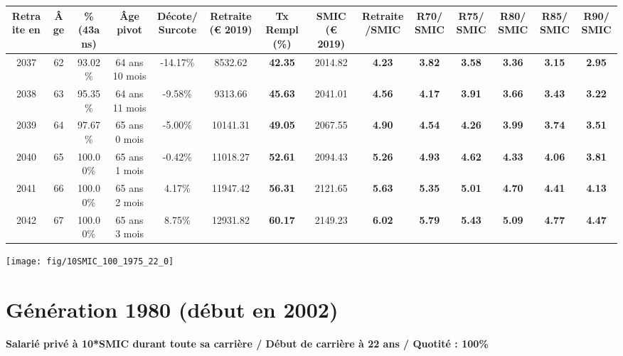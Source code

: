 \begin{adjustbox}{max width=\textwidth} 
\begin{tabular}[htb]{|c|c||c|c|c||c|c||c|c||c|c|c|c|c|} 
\hline 
 Retraite en &  Âge &  \%(43ans) &  Âge pivot &  Décote/Surcote &  Retraite (\euro{} 2019) &  Tx Rempl(\%) &  SMIC (\euro{} 2019) &  Retraite/SMIC &  R70/SMIC &  R75/SMIC &  R80/SMIC &  R85/SMIC &  R90/SMIC \\ 
\hline \hline 
 2037 &  62 &  93.02\% &  64 ans 10 mois &  -14.17\% &  8532.62 &  {\bf 42.35} &  2014.82 &  {\bf 4.23} &  {\bf 3.82} &  {\bf 3.58} &  {\bf 3.36} &  {\bf 3.15} &  {\bf 2.95} \\ 
\hline 
 2038 &  63 &  95.35\% &  64 ans 11 mois &  -9.58\% &  9313.66 &  {\bf 45.63} &  2041.01 &  {\bf 4.56} &  {\bf 4.17} &  {\bf 3.91} &  {\bf 3.66} &  {\bf 3.43} &  {\bf 3.22} \\ 
\hline 
 2039 &  64 &  97.67\% &  65 ans 0 mois &  -5.00\% &  10141.31 &  {\bf 49.05} &  2067.55 &  {\bf 4.90} &  {\bf 4.54} &  {\bf 4.26} &  {\bf 3.99} &  {\bf 3.74} &  {\bf 3.51} \\ 
\hline 
 2040 &  65 &  100.00\% &  65 ans 1 mois &  -0.42\% &  11018.27 &  {\bf 52.61} &  2094.43 &  {\bf 5.26} &  {\bf 4.93} &  {\bf 4.62} &  {\bf 4.33} &  {\bf 4.06} &  {\bf 3.81} \\ 
\hline 
 2041 &  66 &  100.00\% &  65 ans 2 mois &  4.17\% &  11947.42 &  {\bf 56.31} &  2121.65 &  {\bf 5.63} &  {\bf 5.35} &  {\bf 5.01} &  {\bf 4.70} &  {\bf 4.41} &  {\bf 4.13} \\ 
\hline 
 2042 &  67 &  100.00\% &  65 ans 3 mois &  8.75\% &  12931.82 &  {\bf 60.17} &  2149.23 &  {\bf 6.02} &  {\bf 5.79} &  {\bf 5.43} &  {\bf 5.09} &  {\bf 4.77} &  {\bf 4.47} \\ 
\hline 
\hline 
\end{tabular} 
\end{adjustbox} 
 
 \vspace{0.1cm} 

 {\hspace{-2.2cm}\texttt{[image: fig/10SMIC\_100\_1975\_22\_0]}} 

\newpage 
 
\section{Génération 1980 (début en 2002)\label{10SMIC_100_1980_22_0}} 
 
{\bf \noindent Salarié privé à 10*SMIC durant toute sa carrière / Début de carrière à 22 ans / Quotité : 100\%}  ~ 

